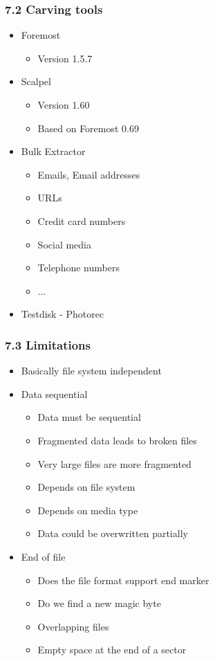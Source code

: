 \begin{frame}[fragile]
  \frametitle{7.2 Carving tools}
    \begin{itemize}
        \item Foremost
            \begin{itemize}
                \item Version 1.5.7
            \end{itemize}
        \item Scalpel
            \begin{itemize}
                \item Version 1.60
                \item Based on Foremost 0.69
            \end{itemize}
        \item Bulk Extractor
            \begin{itemize}
                \item Emails, Email addresses
                \item URLs
                \item Credit card numbers
                \item Social media
                \item Telephone numbers
                \item ...
            \end{itemize}
        \item Testdisk - Photorec
    \end{itemize}
\end{frame}


\begin{frame}[fragile]
  \frametitle{7.3 Limitations}
    \begin{itemize}
        \item Basically file system independent
        \item Data sequential
            \begin{itemize}
                \item Data must be sequential
                \item Fragmented data leads to broken files
                \item Very large files are more fragmented
                \item Depends on file system
                \item Depends on media type
                \item Data could be overwritten partially
            \end{itemize}
        \item End of file
            \begin{itemize}
                \item Does the file format support end marker
                \item Do we find a new magic byte
                \item Overlapping files
                \item Empty space at the end of a sector
            \end{itemize}
    \end{itemize}
\end{frame}


